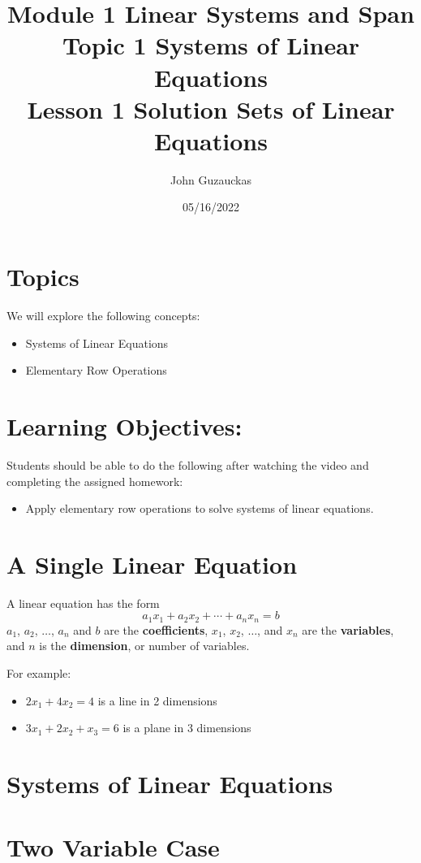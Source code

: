 \documentclass{article}
\title{Module 1 \textendash{} Linear Systems and Span \\
        Topic 1 \textendash{} Systems of Linear Equations \\
        Lesson 1 \textendash{} Solution Sets of Linear Equations}
\author{John Guzauckas}
\date{05/16/2022}
\begin{document}
\maketitle

\section{Topics}
We will explore the following concepts:

\begin{itemize}
    \item Systems of Linear Equations
    \item Elementary Row Operations
\end{itemize}

\section{Learning Objectives:}
Students should be able to do the following after watching the video and
completing the assigned homework:

\begin{itemize}
    \item Apply elementary row operations to solve systems of linear equations.
\end{itemize}

\section{A Single Linear Equation}
A linear equation has the form
\[a_{1}x_{1} + a_{2}x_{2} + \cdots + a_{n}x_{n} = b\]
$a_{1}$, $a_{2}$, $\dots$, $a_{n}$ and $b$ are the \textbf{coefficients}, 
$x_{1}$, $x_{2}$, $\dots$, and $x_{n}$ are the \textbf{variables}, 
and $n$ is the \textbf{dimension}, or number of variables.

For example:

\begin{itemize}
    \item $2x_{1} + 4x_{2} = 4$ is a line in 2 dimensions
    \item $3x_{1} + 2x_{2} + x_{3} = 6$ is a plane in 3 dimensions
\end{itemize}

\section{Systems of Linear Equations}

\section{Two Variable Case}
\end{document}
